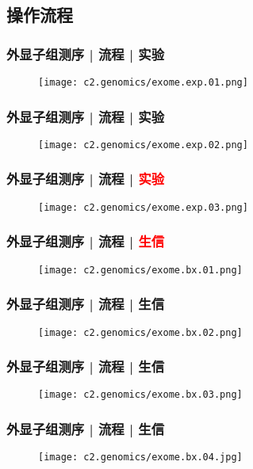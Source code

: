 \subsection{操作流程}
\begin{frame}
  \frametitle{外显子组测序 | 流程 | 实验}
  \begin{figure}
    \centering
    \texttt{[image: c2.genomics/exome.exp.01.png]}
  \end{figure}
\end{frame}

\begin{frame}
  \frametitle{外显子组测序 | 流程 | 实验}
  \begin{figure}
    \centering
    \texttt{[image: c2.genomics/exome.exp.02.png]}
  \end{figure}
\end{frame}

\begin{frame}
  \frametitle{外显子组测序 | 流程 | \textcolor{red}{实验}}
  \begin{figure}
    \centering
    \texttt{[image: c2.genomics/exome.exp.03.png]}
  \end{figure}
\end{frame}

\begin{frame}
  \frametitle{外显子组测序 | 流程 | \textcolor{red}{生信}}
  \begin{figure}
    \centering
    \texttt{[image: c2.genomics/exome.bx.01.png]}
  \end{figure}
\end{frame}

\begin{frame}
  \frametitle{外显子组测序 | 流程 | 生信}
  \begin{figure}
    \centering
    \texttt{[image: c2.genomics/exome.bx.02.png]}
  \end{figure}
\end{frame}

\begin{frame}
  \frametitle{外显子组测序 | 流程 | 生信}
  \begin{figure}
    \centering
    \texttt{[image: c2.genomics/exome.bx.03.png]}
  \end{figure}
\end{frame}

\begin{frame}
  \frametitle{外显子组测序 | 流程 | 生信}
  \begin{figure}
    \centering
    \texttt{[image: c2.genomics/exome.bx.04.jpg]}
  \end{figure}
\end{frame}


